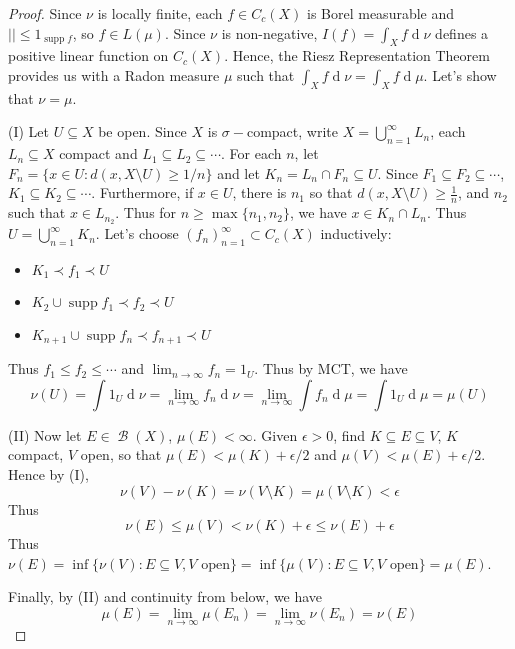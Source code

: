 \documentclass[11pt, a4paper]{memoir}
\theoremstyle{change}
\theoremstyle{plain}
\theoremstyle{nonumberplain}
\newtheorem{proof}{Proof}
\DeclareMathOperator{\B}{{\mathcal{B}}}
\DeclareMathOperator{\supp}{supp}
\renewcommand{\d}[1]{\ensuremath{\operatorname{d}\!{#1}}}
\numberwithin{equation}{section}
\begin{document}
\begin{proof}
    Since $\nu$ is locally finite, each $f\in C_c(X)$ is Borel measurable and $||\leq 1_{\supp f}$, so $f\in L(\mu)$.
    Since $\nu$ is non-negative, $I(f)=\int_X f\d{\nu}$ defines a positive linear function on $C_c(X)$.
    Hence, the Riesz Representation Theorem provides us with a Radon measure $\mu$ such that $\int_X f\d{\nu}=\int_X f\d{\mu}$.
    Let's show that $\nu=\mu$.

    (I) Let $U\subseteq X$ be open.
    Since $X$ is $\sigma-$compact, write $X=\bigcup_{n=1}^\infty L_n$, each $L_n\subseteq X$ compact and $L_1\subseteq L_2\subseteq\cdots$.
    For each $n$, let $F_n=\{x\in U: d(x,X\setminus U)\geq1/n\}$ and let $K_n=L_n\cap F_n\subseteq U$.
    Since $F_1\subseteq F_2\subseteq\cdots$, $K_1\subseteq K_2\subseteq\cdots$.
    Furthermore, if $x\in U$, there is $n_1$ so that $d(x,X\setminus U)\geq \frac{1}{n}$, and $n_2$ such that $x\in L_{n_2}$.
    Thus for $n\geq\max\{n_1,n_2\}$, we have $x\in K_n\cap L_n$.
    Thus $U=\bigcup_{n=1}^\infty K_n$.
    Let's choose $(f_n)_{n=1}^\infty\subset C_c(X)$ inductively:
    \begin{itemize}[nl]
        \item $K_1\prec f_1\prec U$
        \item $K_2\cup \supp f_1\prec f_2\prec U$
        \item $K_{n+1}\cup\supp f_n\prec f_{n+1}\prec U$
    \end{itemize}
    Thus $f_1\leq f_2\leq\cdots$ and $\lim_{n\to\infty}f_n=1_U$.
    Thus by MCT, we have
    \begin{equation*}
        \nu(U)=\int 1_U\d{\nu}=\lim_{n\to\infty}f_n\d{\nu}=\lim_{n\to\infty}\int f_n\d{\mu}=\int 1_U\d{\mu}=\mu(U)
    \end{equation*}

    (II) Now let $E\in\B(X)$, $\mu(E)<\infty$.
    Given $\epsilon>0$, find $K\subseteq E\subseteq V$, $K$ compact, $V$ open, so that $\mu(E)<\mu(K)+\epsilon/2$ and $\mu(V)<\mu(E)+\epsilon/2$.
    Hence by (I),
    \begin{equation*}
        \nu(V)-\nu(K) = \nu(V\setminus K) =\mu(V\setminus K)<\epsilon
    \end{equation*}
    Thus
    \begin{equation*}
        \nu(E)\leq\mu(V)<\nu(K)+\epsilon\leq\nu(E)+\epsilon
    \end{equation*}
    Thus $\nu(E)=\inf\{\nu(V):E\subseteq V,V\text{ open}\}=\inf\{\mu(V):E\subseteq V,V\text{ open}\}=\mu(E)$.

    Finally, by (II) and continuity from below, we have
    \begin{equation*}
        \mu(E)=\lim_{n\to\infty}\mu(E_n)=\lim_{n\to\infty}\nu(E_n)=\nu(E)
    \end{equation*}
\end{proof}
\end{document}
